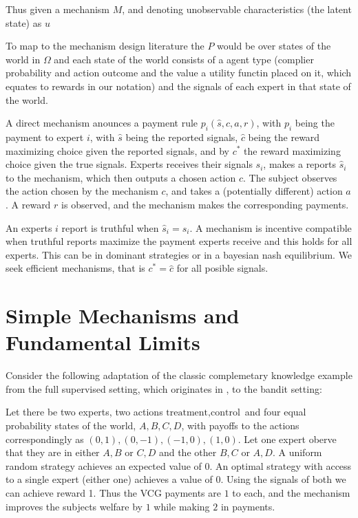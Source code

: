 Thus given a mechanism $M$, and denoting unobservable characteristics (the latent state) as $u$


%	


To map to the mechanism design literature the $P$ would be over states of the world in $\Omega$ and each state of the world consists of a agent type (complier probability and action outcome and the value a utility functin placed on it, which equates to rewards in our notation) and the signals of each expert in that state of the world.

A direct mechanism anounces a payment rule $p_i(\hat{s}, c,a,r)$, with $p_i$ being the payment to expert $i$, with $\hat{s}$ being the reported signals, $\hat{c}$ being the reward maximizing choice given the reported signals, and by $c^{*}$ the reward maximizing choice given the true signals.
Experts receives their signals $s_i$, makes a reports $\hat{s}_i$ to the mechanism, which then outputs a chosen action $c$.
The subject observes the action chosen by the mechanism $c$, and takes a (potentially different) action $a$. A reward $r$ is observed, and the mechanism makes the corresponding payments.

An experts $i$ report is truthful when $\hat{s}_i=s_i$. A mechanism is incentive compatible when truthful reports maximize the payment experts receive and this holds for all experts. This can be in dominant strategies or in a bayesian nash equilibrium.  We seek efficient mechanisms, that is $c^{*} = \hat{c}$ for all posible signals.

\section{Simple Mechanisms and Fundamental Limits}

Consider the following adaptation of the classic complemetary knowledge example from the full supervised setting, which originates in \cite{geanakoplos1982we}, to the bandit setting:

\begin{eg}\label{eg:comp-ex}
	Let there be two experts, two actions ${\text{treatment},\text{control}}$ and four equal probability states of the world, ${A,B,C,D}$, with payoffs to the actions correspondingly as ${(0,1),(0,-1),(-1,0),(1,0)}$. Let one expert oberve that they are in either ${A,B}$ or ${C,D}$ and the other ${B,C}$ or ${A,D}$. A uniform random strategy achieves an expected value of 0. An optimal strategy with access to a single expert (either one) achieves a value of 0. Using the signals of both we can achieve reward 1. Thus the VCG payments are $1$ to each, and the mechanism improves the subjects welfare by $1$ while making $2$ in payments. 
\end{eg}

